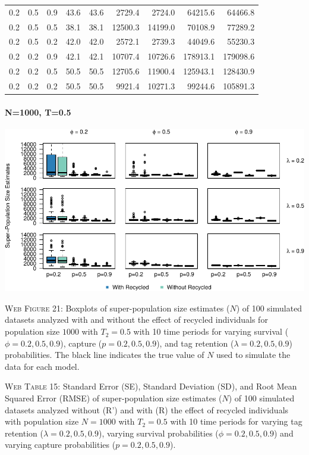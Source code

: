 \documentclass[]{article}
\let\oldparagraph\paragraph
\renewcommand{\paragraph}[1]{\oldparagraph{#1}\mbox{}}
\begin{document}
\begin{table}[ht]
{\begin{tabular}{rrrrrrrrr}
  0.2 & 0.5 & 0.9 & 43.6 & 43.6 & 2729.4 & 2724.0 & 64215.6 & 64466.8 \\ 
  0.2 & 0.5 & 0.5 & 38.1 & 38.1 & 12500.3 & 14199.0 & 70108.9 & 77289.2 \\ 
  0.2 & 0.5 & 0.2 & 42.0 & 42.0 & 2572.1 & 2739.3 & 44049.6 & 55230.3 \\ 
  0.2 & 0.2 & 0.9 & 42.1 & 42.1 & 10707.4 & 10726.6 & 178913.1 & 179098.6 \\ 
  0.2 & 0.2 & 0.5 & 50.5 & 50.5 & 12705.6 & 11900.4 & 125943.1 & 128430.9 \\ 
  0.2 & 0.2 & 0.2 & 50.5 & 50.5 & 9921.4 & 10271.3 & 99244.6 & 105891.3 \\ 
   \hline
\end{tabular}
}
\endgroup
\end{table}

\newpage

\paragraph{N=1000, T=0.5}\label{n1000-t0.5-3}

\includegraphics{Appendix_files/figure-latex/figure21_superN_GJSTL4-1.pdf}

\textsc{Web Figure 21:} Boxplots of super-population size estimates
(\(N\)) of 100 simulated datasets analyzed with and without the effect
of recycled individuals for population size \(1000\) with \(T_2=0.5\)
with 10 time periods for varying survival (\(\phi=0.2,0.5,0.9\)),
capture (\(p=0.2,0.5,0.9\)), and tag retention (\(\lambda=0.2,0.5,0.9\))
probabilities. The black line indicates the true value of \(N\) used to
simulate the data for each model.

\textsc{Web Table 15:} Standard Error (SE), Standard Deviation (SD), and
Root Mean Squared Error (RMSE) of super-population size estimates
(\(N\)) of 100 simulated datasets analyzed without (R') and with (R) the
effect of recycled individuals with population size \(N=1000\) with
\(T_2=0.5\) with 10 time periods for varying tag retention
(\(\lambda=0.2,0.5,0.9\)), varying survival probabilities
(\(\phi=0.2,0.5,0.9\)) and varying capture probabilities
(\(p=0.2,0.5,0.9\)).
\end{document}
